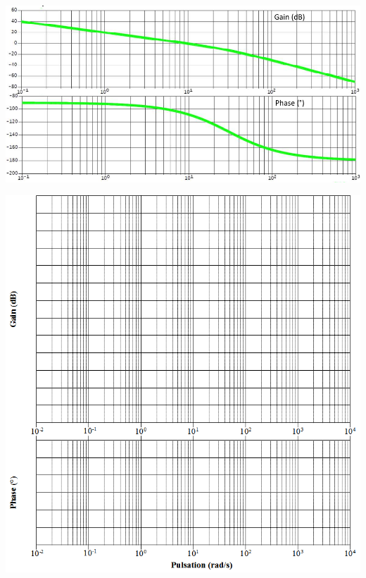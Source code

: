 \documentclass[10pt,fleqn]{article} %
\begin{document}
\begin{center}
\includegraphics[width=\linewidth]{images/fig_06}
\end{center}
\begin{center}
\includegraphics[width=\linewidth]{images/img_04}
\end{center}
\end{document}
